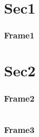 \documentclass{beamer}
\begin{document}
\begin{frame}
\tableofcontents
\end{frame}

\section{Sec1}
\begin{frame}
\frametitle{Frame1}
\end{frame}

\section{Sec2}
\begin{frame}
\frametitle{Frame2}
\end{frame}

\section{} %
\begin{frame}
\frametitle{Frame3}
\end{frame}
\end{document}
